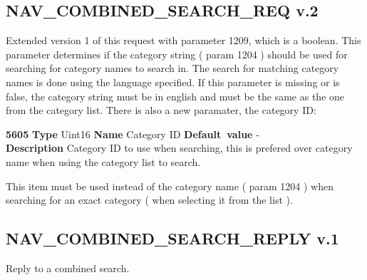 \documentclass[a4paper]{article}
\begin{document}
\subsection{NAV\_COMBINED\_SEARCH\_REQ v.2}
Extended version 1 of this request with parameter 1209, which is a boolean.
This parameter determines if the category string ( param 1204 ) should be used for searching
for category names to search in. The search for matching category names is done
using the language specified. If this parameter is missing or is false, the
category string must be in english and must be the same as the one from the
category list.
There is also a new paramater, the category ID:
\begin{list}{\textbf{ParamID}}{}
\item \textbf{5605} \textbf{Type} Uint16 \textbf{Name} Category ID
                 \textbf{Default~value} - \\
  \label{combined_search_req:Category_ID}
  \textbf{Description} Category ID to use when searching, this is prefered over
  category name when using the category list to search.
\end{list}
This item must be used instead of the category name ( param 1204 ) when searching
for an exact category ( when selecting it from the list ).

\subsection{NAV\_COMBINED\_SEARCH\_REPLY v.1}

Reply to a combined search.
\end{document}
